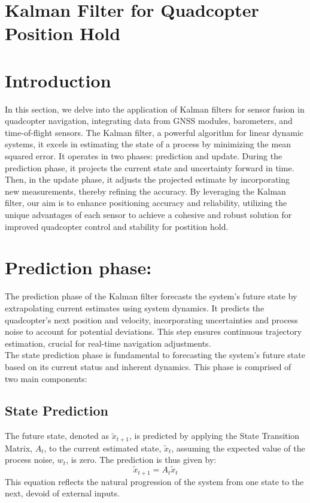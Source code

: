 \documentclass{article}
\begin{document}
\section*{Kalman Filter for Quadcopter Position Hold}

\section{Introduction}
In this section, we delve into the application of Kalman filters for sensor fusion in quadcopter navigation, integrating data from GNSS modules, barometers, and time-of-flight sensors. The Kalman filter, a powerful algorithm for linear dynamic systems, it excels in estimating the state of a process by minimizing the mean squared error. It operates in two phases: prediction and update. During the prediction phase, it projects the current state and uncertainty forward in time. Then, in the update phase, it adjusts the projected estimate by incorporating new measurements, thereby refining the accuracy. By leveraging the Kalman filter, our aim is to enhance positioning accuracy and reliability, utilizing the unique advantages of each sensor to achieve a cohesive and robust solution for improved quadcopter control and stability for postition hold.

\section{Prediction phase:}
The prediction phase of the Kalman filter forecasts the system's future state by extrapolating current estimates using system dynamics. It predicts the quadcopter's next position and velocity, incorporating uncertainties and process noise to account for potential deviations. This step ensures continuous trajectory estimation, crucial for real-time navigation adjustments.
\\

\noindent
The state prediction phase is fundamental to forecasting the system's future state based on its current status and inherent dynamics. This phase is comprised of two main components:

\subsection{State Prediction}
The future state, denoted as \( \widetilde{x}_{t+1} \), is predicted by applying the State Transition Matrix, \( A_t \), to the current estimated state, \( \widetilde{x}_t \), assuming the expected value of the process noise, \( w_t \), is zero. The prediction is thus given by:
\[
\widetilde{x}_{t+1} = A_t \widetilde{x}_t
\]
This equation reflects the natural progression of the system from one state to the next, devoid of external inputs.
\end{document}
